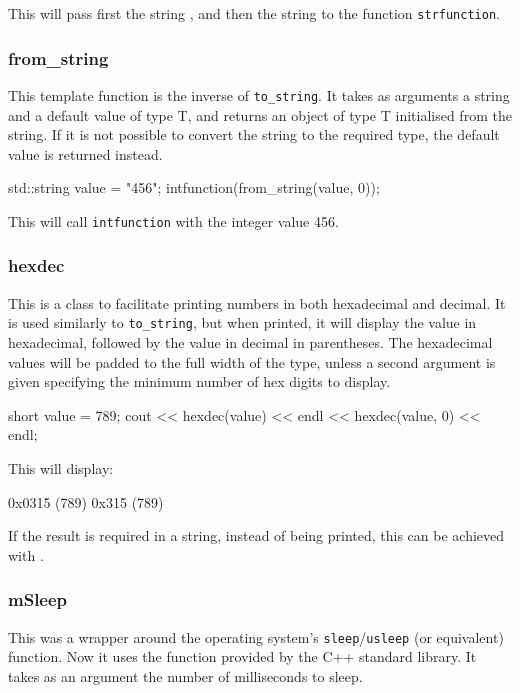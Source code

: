 This will pass first the string ,
and then the string 
to the function \texttt{strfunction}.

\subsubsection{from\_string}
This template function is the inverse of \texttt{to\_string}.
It takes as arguments a string and a default value of type T,
and returns an object of type T initialised from the string.
If it is not possible to convert the string to the required type,
the default value is returned instead.
\begin{listing}
std::string value = "456";
intfunction(from_string(value, 0));
\end{listing}

This will call \texttt{intfunction} with the integer value 456.

\subsubsection{hexdec}
This is a class to facilitate printing numbers in both hexadecimal and decimal.
It is used similarly to \texttt{to\_string}, but when printed,
it will display the value in hexadecimal, followed by the value in decimal in parentheses.
The hexadecimal values will be padded to the full width of the type,
unless a second argument is given specifying the minimum number of hex digits to display.
\begin{listing}
short value = 789;
cout << hexdec(value) << endl
     << hexdec(value, 0) << endl;
\end{listing}

This will display:
\begin{listing}[]
0x0315 (789)
0x315 (789)
\end{listing}

If the result is required in a string, instead of being printed,
this can be achieved with .

\subsubsection{mSleep}\label{sec:mSleep}
This was a wrapper around the operating system's \texttt{sleep}/\texttt{usleep}
(or equivalent) function. Now it uses the  function provided by the C++ standard library. It takes as an argument the number of milliseconds to sleep.

